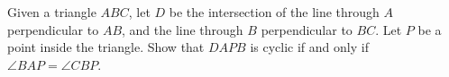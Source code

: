 \documentclass[varwidth]{standalone}
\begin{document}
    Given a triangle $ABC$, let $D$ be the intersection of the line through $A$ perpendicular to $AB$, and the line through $B$ perpendicular to $BC$. Let $P$ be a point inside the triangle. Show that $DAPB$ is cyclic if and only if $\angle BAP = \angle CBP$.
\end{document}

